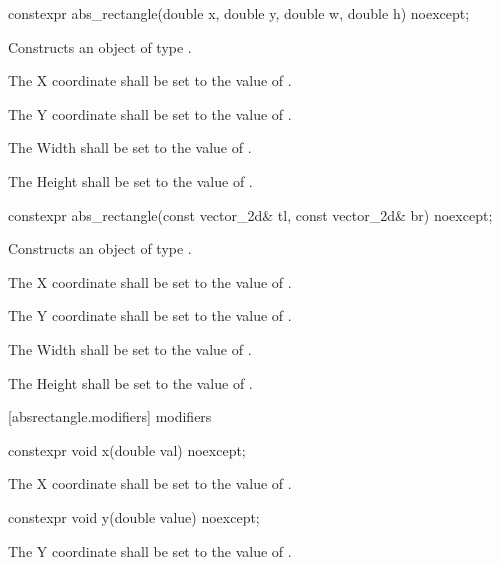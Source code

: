 \begin{itemdecl}
constexpr abs_rectangle(double x, double y, double w, double h) noexcept;
\end{itemdecl}
\begin{itemdescr}
\pnum
\effects
Constructs an object of type .

\pnum
The X coordinate shall be set to the value of .

\pnum
The Y coordinate shall be set to the value of .

\pnum
The Width shall be set to the value of .

\pnum
The Height shall be set to the value of .
\end{itemdescr}

\begin{itemdecl}
constexpr abs_rectangle(const vector_2d& tl, const vector_2d& br) noexcept;
\end{itemdecl}
\begin{itemdescr}
\pnum
\effects
Constructs an object of type .

\pnum
The X coordinate shall be set to the value of .

\pnum
The Y coordinate shall be set to the value of .

\pnum
The Width shall be set to the value of .

\pnum
The Height shall be set to the value of .
\end{itemdescr}

 [absrectangle.modifiers]{ modifiers}

\begin{itemdecl}
constexpr void x(double val) noexcept;
\end{itemdecl}

\begin{itemdescr}
\pnum
\effects
The X coordinate shall be set to the value of .
\end{itemdescr}

\begin{itemdecl}
constexpr void y(double value) noexcept;
\end{itemdecl}
\begin{itemdescr}
\pnum
\effects
The Y coordinate shall be set to the value of .
\end{itemdescr}

